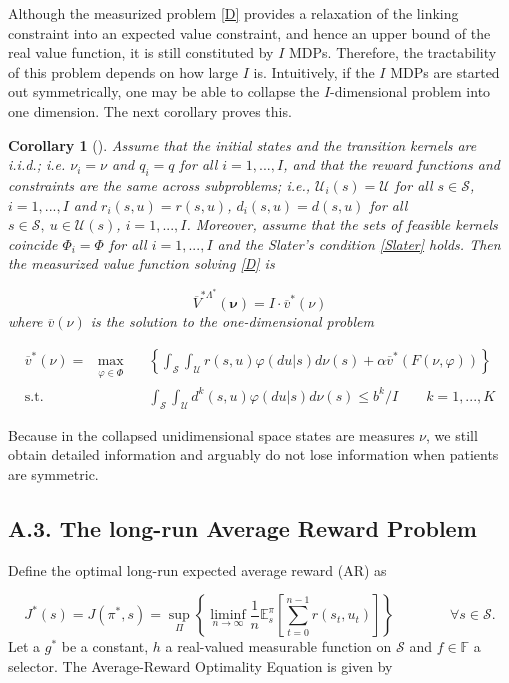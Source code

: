 \documentclass[12pt,a4paper]{article}
\newtheorem{corollary}{Corollary}
\newcommand{\bnu}{\pmb{\nu}}
\newcommand{\mS}{\mathcal{S}}
\newcommand{\mU}{\mathcal{U}}
\newcommand{\oV}{\overline{V}}
\newcommand{\ov}{\overline{v}}
\begin{document}
		
		Although the measurized problem \eqref{D} provides a relaxation of the linking constraint into an expected value constraint, and hence an upper bound of the real value function, it is still constituted by $I$ MDPs. Therefore, the tractability of this problem depends on how large $I$ is. Intuitively, if the $I$ MDPs are started out symmetrically, one may be able to collapse the $I$-dimensional problem into one dimension. The next corollary proves this.
		
		
		\begin{corollary}[\cite{measurizedWMDP}]\label{cor:iid}
			Assume that the initial states and the transition kernels are i.i.d.; i.e. $\nu_i=\nu$ and $q_i=q$ for all $i=1,...,I$, and that the reward functions and constraints are the same across subproblems; i.e., $\mU_i(s)=\mU$ for all $s \in \mS$, $i=1,...,I$ and $r_i(s,u)=r(s,u)$, $d_i(s,u)=d(s,u)$ for all $s \in \mS, \ u \in \mU(s)$, $i=1,...,I$. Moreover, assume that the sets of feasible kernels coincide $\Phi_i=\Phi$ for all $i=1,...,I$ and the Slater's condition \eqref{Slater} holds. Then the measurized value function solving \eqref{D} is
			
			\begin{equation*}%
				\oV^{*\Lambda^*}(\bnu)=I\cdot \ov^*(\nu)
			\end{equation*}
			where $\ov(\nu)$ is the solution to the one-dimensional problem
			
			\begin{align*} %
				\ov^*(\nu)= \ \max_{\substack{\varphi \in \Phi}}& \ \ \left\{ \int_{\mS} \int_{\mU} r(s,u) \varphi(du|s) d\nu(s)+ \alpha \ov^*(F(\nu,\varphi))\right\} \\
				\mbox{s.t.} & \  \ \int_{\mS} \int_{\mU} d^k(s,u) \varphi(du|s) d\nu(s) \leq b^k/I \qquad k=1,...,K \nonumber
			\end{align*}
		\end{corollary}
		Because in the collapsed unidimensional space states are measures $\nu$, we still obtain detailed information and arguably do not lose information when patients are symmetric.
		
		\subsection*{A.3. The long-run Average Reward Problem}
		
		Define the optimal long-run expected average reward (AR) as
		
		\begin{equation*}\label{Jn}
			J^*(s)=J(\pi^*,s)=\sup_{\Pi} \left\{ \liminf_{n\rightarrow \infty} \frac{1}{n} \mathbb{E}_s^{\pi} \left[ \sum_{t=0}^{n-1} r(s_t,u_t)\right] \right\} \qquad \qquad \forall s \in \mS.
		\end{equation*}
		Let a $g^*$ be a constant, $h$ a real-valued measurable function on $\mS$ and $f \in \mathbb{F}$ a selector. The Average-Reward Optimality Equation is given by
		
\end{document}
